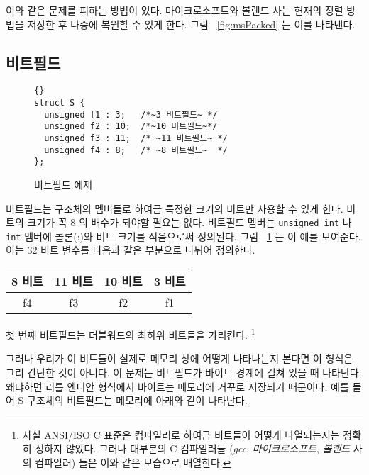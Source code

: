 이와 같은 문제를 피하는 방법이 있다. 마이크로소프트와 볼랜드 사는 현재의
정렬 방법을 저장한 후 나중에 복원할 수 있게 한다. 그림 ~\ref{fig:msPacked} 는 이를 
나타낸다. 


\subsection{비트필드}

\begin{figure}[t]
\begin{lstlisting}[frame=tlrb,stepnumber=0,escapeinside=~~]{}
struct S {
  unsigned f1 : 3;   /*~3 비트필드~ */
  unsigned f2 : 10;  /*~10 비트필드~*/
  unsigned f3 : 11;  /* ~11 비트필드~ */
  unsigned f4 : 8;   /* ~8 비트필드~  */
};
\end{lstlisting}
\caption{비트필드 예제 \label{fig:bitStruct}}
\end{figure}

비트필드는 구조체의 멤버들로 하여금 특정한 크기의 비트만 사용할 수 있게 한다.
비트의 크기가 꼭 8 의 배수가 되야할 필요는 없다. 비트필드 멤버는 
\lstinline|unsigned int| 나 \lstinline|int| 멤버에 콜론(:)와 비트 크기를 적음으로써 정의된다. 
그림 ~\ref{fig:bitStruct} 는 이 예를 보여준다. 이는 32 비트 변수를 다음과 같은 부분으로
나뉘어 정의한다. 

\begin{center}
\begin{tabular}{|c|c|c|c|}
\multicolumn{1}{c}{8 비트} & \multicolumn{1}{c}{11 비트} 
& \multicolumn{1}{c}{10 비트} & \multicolumn{1}{c}{3 비트} \\ \hline
\hspace{2em} f4 \hspace{2em} & \hspace{3em} f3 \hspace{3em}
& \hspace{3em} f2 \hspace{3em} & f1 \\
\hline
\end{tabular}
\end{center}
첫 번째 비트필드는 더블워드의 최하위 비트들을 가리킨다. 
\footnote{사실 ANSI/ISO C 표준은 컴파일러로 하여금
비트들이 어떻게 나열되는지는 정확히 정하지 않았다. 그러나 대부분의 C 컴파일러들 (\emph{gcc},
\emph{마이크로소프트}, \emph{볼랜드} 사의 컴파일러) 들은 이와 같은 모습으로 배열한다.}

그러나 우리가 이 비트들이 실제로 메모리 상에 어떻게 나타나는지 본다면 이 형식은 그리 간단한 것이
아니다. 이 문제는 비트필드가 바이트 경계에 걸쳐 있을 때 나타난다. 왜냐하면 리틀 엔디안 형식에서
바이트는 메모리에 거꾸로 저장되기 때문이다. 예를 들어 {\code S} 구조체의 비트필드는 메모리에
아래와 같이 나타난다. 

